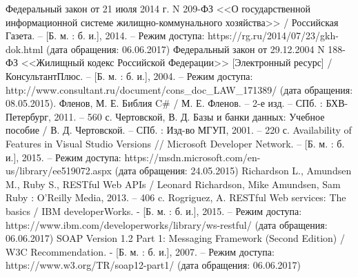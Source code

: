 \begin{thebibliography}{99}
	 Федеральный закон от 21 июля 2014 г. N 209-ФЗ <<О государственной информационной системе жилищно-коммунального хозяйства>> / Российская Газета. – [Б. м. : б. и.], 2014. – Режим доступа: https://rg.ru/2014/07/23/gkh-dok.html (дата обращения: 06.06.2017)
	 Федеральный закон от 29.12.2004 N 188-ФЗ <<Жилищный кодекс Российской Федерации>> [Электронный ресурс] / КонсультантПлюс. – [Б. м. : б. и.], 2004. – Режим доступа: http://www.consultant.ru/document/cons\_doc\_LAW\_171389/ (дата обращения: 08.05.2015).
	 Фленов, М. Е. Библия C\# / М. Е. Фленов. – 2-е изд. – СПб. : БХВ-Петербург, 2011. – 560 с.
	 Чертовской, В. Д. Базы и банки данных: Учебное пособие / В. Д. Чертовской. – СПб. : Изд-во МГУП, 2001. –  220 с.
	 Availability of Features in Visual Studio Versions // Microsoft Developer Network. – [Б. м. : б. и.], 2015. – Режим доступа: https://msdn.microsoft.com/en-us/library/ee519072.aspx (дата обращения: 24.05.2015)
	 Richardson L., Amundsen M., Ruby S., RESTful Web APIs / Leonard Richardson, Mike Amundsen, Sam Ruby : O'Reilly Media, 2013. – 406 c.
	 Rogriguez, A. RESTful Web services: The basics / IBM developerWorks. - [Б. м. : б. и.], 2015. – Режим доступа: https://www.ibm.com/developerworks/library/ws-restful/ (дата обращения: 06.06.2017)
	 SOAP Version 1.2 Part 1: Messaging Framework (Second Edition) / W3C Recommendation. - [Б. м. : б. и.], 2007. – Режим доступа: https://www.w3.org/TR/soap12-part1/ (дата обращения: 06.06.2017)
\end{thebibliography}


\clearpage
\newpage